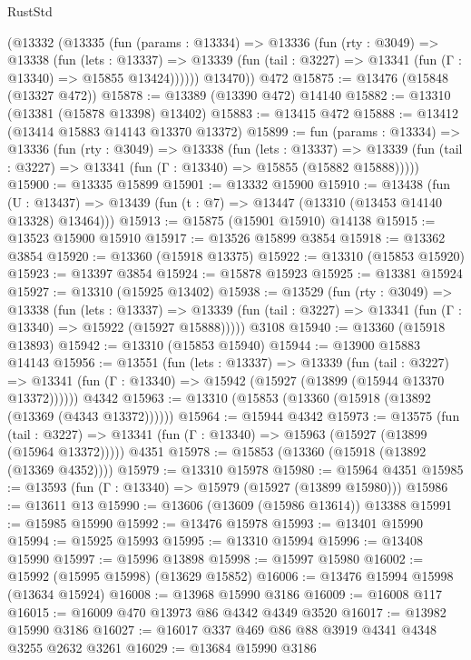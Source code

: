 \begin{lexlean}{RustStd}
\begin{coremodule}
      (@13332
        (@13335
          (fun (params : @13334) =>
          @13336
            (fun (rty : @3049) =>
            @13338
              (fun (lets : @13337) =>
              @13339 (fun (tail : @3227) => @13341 (fun (Γ : @13340) => @15855 @13424))))))
        @13470))
    @472
@15875 := @13476 (@15848 (@13327 @472))
@15878 := @13389 (@13390 @472) @14140
@15882 := @13310 (@13381 (@15878 @13398) @13402)
@15883 := @13415 @472
@15888 := @13412 (@13414 @15883 @14143 @13370 @13372)
@15899 := fun (params : @13334) =>
  @13336
    (fun (rty : @3049) =>
    @13338
      (fun (lets : @13337) =>
      @13339 (fun (tail : @3227) => @13341 (fun (Γ : @13340) => @15855 (@15882 @15888)))))
@15900 := @13335 @15899
@15901 := @13332 @15900
@15910 := @13438
    (fun (U : @13437) => @13439 (fun (t : @7) => @13447 (@13310 (@13453 @14140 @13328) @13464)))
@15913 := @15875 (@15901 @15910) @14138
@15915 := @13523 @15900 @15910
@15917 := @13526 @15899 @3854
@15918 := @13362 @3854
@15920 := @13360 (@15918 @13375)
@15922 := @13310 (@15853 @15920)
@15923 := @13397 @3854
@15924 := @15878 @15923
@15925 := @13381 @15924
@15927 := @13310 (@15925 @13402)
@15938 := @13529
    (fun (rty : @3049) =>
    @13338
      (fun (lets : @13337) =>
      @13339 (fun (tail : @3227) => @13341 (fun (Γ : @13340) => @15922 (@15927 @15888)))))
    @3108
@15940 := @13360 (@15918 @13893)
@15942 := @13310 (@15853 @15940)
@15944 := @13900 @15883 @14143
@15956 := @13551
    (fun (lets : @13337) =>
    @13339
      (fun (tail : @3227) =>
      @13341 (fun (Γ : @13340) => @15942 (@15927 (@13899 (@15944 @13370 @13372))))))
    @4342
@15963 := @13310 (@15853 (@13360 (@15918 (@13892 (@13369 (@4343 @13372))))))
@15964 := @15944 @4342
@15973 := @13575
    (fun (tail : @3227) => @13341 (fun (Γ : @13340) => @15963 (@15927 (@13899 (@15964 @13372)))))
    @4351
@15978 := @15853 (@13360 (@15918 (@13892 (@13369 @4352))))
@15979 := @13310 @15978
@15980 := @15964 @4351
@15985 := @13593 (fun (Γ : @13340) => @15979 (@15927 (@13899 @15980)))
@15986 := @13611 @13
@15990 := @13606 (@13609 (@15986 @13614)) @13388
@15991 := @15985 @15990
@15992 := @13476 @15978
@15993 := @13401 @15990
@15994 := @15925 @15993
@15995 := @13310 @15994
@15996 := @13408 @15990
@15997 := @15996 @13898
@15998 := @15997 @15980
@16002 := @15992 (@15995 @15998) (@13629 @15852)
@16006 := @13476 @15994 @15998 (@13634 @15924)
@16008 := @13968 @15990 @3186
@16009 := @16008 @117
@16015 := @16009 @470 @13973 @86 @4342 @4349 @3520
@16017 := @13982 @15990 @3186
@16027 := @16017 @337 @469 @86 @88 @3919 @4341 @4348 @3255 @2632 @3261
@16029 := @13684 @15990 @3186

\end{coremodule}
\end{lexlean}
